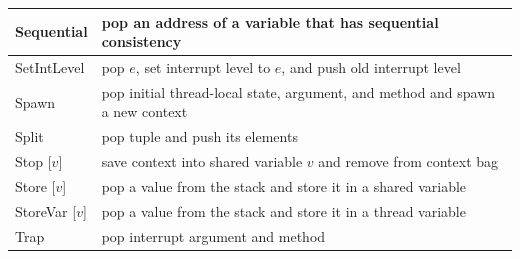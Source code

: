 \documentclass{report}
\begin{document}
{\begin{tabular}{|l|l|}
\hline
Sequential & pop an address of a variable that has sequential consistency \\
\hline
SetIntLevel & pop $e$, set interrupt level to $e$, and push old interrupt level \\
\hline
Spawn & pop initial thread-local state, argument, and method and spawn a new context \\
\hline
Split & pop tuple and push its elements \\
\hline
Stop [$v$] & save context into shared variable $v$ and remove from context bag \\
\hline
Store [$v$] & pop a value from the stack and store it in a shared variable \\
\hline
StoreVar [$v$] & pop a value from the stack and store it in a thread variable \\
\hline
Trap & pop interrupt argument and method \\
\hline
\end{tabular}
}
\end{document}
